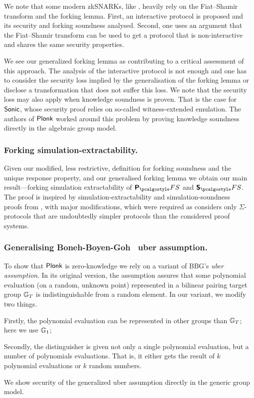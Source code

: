 \documentclass[runningheads,10pt]{llncs}
\begin{document}
We note that some modern zkSNARKs, like \cite{SP:BBBPWM18,CCS:MBKM19}, heavily
rely on the Fiat--Shamir transform and the forking lemma. First, an interactive
protocol is proposed and its security and forking soundness analysed. Second,
one uses an argument that the Fiat--Shamir transform can be used to get a
protocol that is non-interactive and shares the same security properties.

We see our generalized forking lemma as contributing to a critical assessment of
this approach. The analysis of the interactive protocol is not enough and one
has to consider the security loss implied by the generalisation of the forking
lemma or disclose a transformation that does not suffer this loss. We note that
the security loss may also apply when knowledge soundness is proven. That is the
case for ${\textnormal{\textsf{Sonic}}}$, whose security proof relies on so-called witness-extended
emulation. The authors of $\textnormal{\textsf{Plonk}}$ worked around this problem by proving
knowledge soundness directly in the algebraic group model.

\subsubsection{Forking simulation-extractability.} Given our modified, less
restrictive, definition for forking soundness and the unique response property,
and our generalised forking lemma we obtain our main
result---forking simulation extractability of $\plonkprotfs$ and $\sonicprotfs$. The
proof is inspired by simulation-extractability and simulation-soundness proofs
from \cite{INDOCRYPT:FKMV12}, with major modifications, which were required as
\cite{INDOCRYPT:FKMV12} considers only $\Sigma$-protocols
that are undoubtedly simpler protocols than the considered proof systems.

\subsubsection{Generalising Boneh-Boyen-Goh~\cite{EC:BonBoyGoh05} uber assumption.}
To show that $\textnormal{\textsf{Plonk}}$ is zero-knowledge we rely on a variant of
BBG's \emph{uber assumption}. In its original version, the
assumption assures that some polynomial evaluation (on a random, unknown point)
represented in a bilinear pairing target group $\mathbb{G}_T$ is indistinguishable
from a random element. In our variant, we modify two things.
\begin{inparaenum}[(1)]
\item Firstly, the polynomial evaluation can be represented in other groups
  than $\mathbb{G}_T$; here we use $\mathbb{G}_1$;
\item Secondly, the distinguisher is given not only a single polynomial evaluation,
  but a number of polynomials  evaluations. That is, it either gets the result of $k$ polynomial
  evaluations or $k$ random numbers.
\end{inparaenum}
We show security of the generalized uber assumption directly in the generic
group model.
\end{document}

